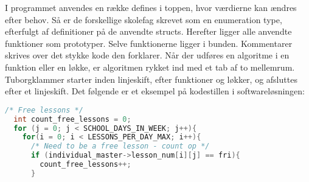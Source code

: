 I programmet anvendes en række defines i toppen, hvor værdierne kan ændres efter behov. Så er de forskellige skolefag skrevet som en enumeration type, efterfulgt af definitioner på de anvendte structs. Herefter ligger alle anvendte funktioner som prototyper. Selve funktionerne ligger i bunden. Kommentarer skrives over det stykke kode den forklarer. Når der udføres en algoritme i en funktion eller en løkke, er algoritmen rykket ind med et tab af to mellemrum. Tuborgklammer starter inden linjeskift, efter funktioner og løkker, og afsluttes efter et linjeskift. Det følgende er et eksempel på kodestillen i softwareløsningen: 
\begin{lstlisting}[language=c]
/* Free lessons */
  int count_free_lessons = 0;
  for (j = 0; j < SCHOOL_DAYS_IN_WEEK; j++){
    for(i = 0; i < LESSONS_PER_DAY_MAX; i++){
      /* Need to be a free lesson - count op */
      if (individual_master->lesson_num[i][j] == fri){
        count_free_lessons++;
      }
\end{lstlisting}